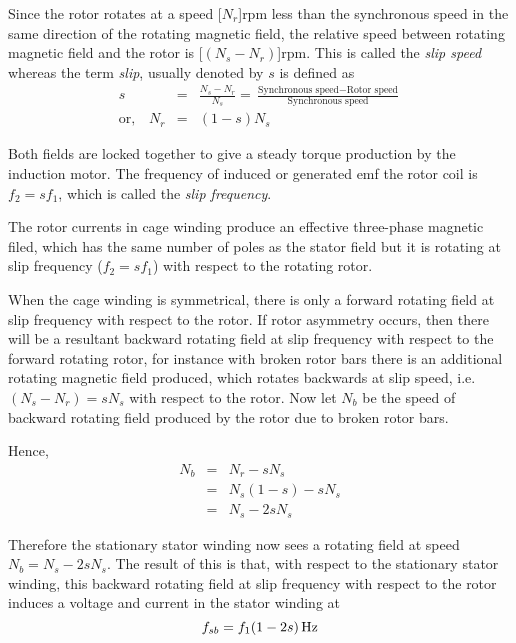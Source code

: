 \documentclass[a4paper,11pt]{report}
\begin{document}
Since the rotor rotates at a speed \unit[$N_{r}$]{rpm} less than the synchronous speed in the same direction of the rotating magnetic field, the relative speed between rotating magnetic field and the rotor is \unit[$(N_{s} - N_{r})$]{rpm}. This is called the \emph{slip speed} whereas the term \emph{slip}, usually denoted by $s$ is defined as
\begin{eqnarray*}
s &=& \frac{N_{s}-N_{r}}{N_{s}}=\frac{\textrm{Synchronous speed}-\textrm{Rotor speed}}{\textrm{Synchronous speed}} \\
\textrm{or,} \quad N_{r} &=& (1-s)N_{s}
\end{eqnarray*}

Both fields are locked together to give a steady torque production by the induction motor. The frequency of induced or generated emf the rotor coil is $f_{2}=sf_{1}$, which is called the \emph{slip frequency}.

The rotor currents in cage winding produce an effective three-phase magnetic filed, which has the same number of poles as the stator field but it is rotating at slip frequency ($f_{2}=sf_{1}$) with respect to the rotating rotor. 

When the cage winding is symmetrical, there is only a forward rotating field at slip frequency with respect to the rotor. If rotor asymmetry occurs, then there will be a resultant backward rotating field at slip frequency with respect to the forward rotating rotor, for instance with broken rotor bars there is an additional rotating magnetic field produced, which rotates backwards at slip speed, i.e. $(N_{s} - N_{r}) = sN_{s}$ with respect to the rotor.
Now let $N_{b}$ be the speed of backward rotating field produced by the rotor due to broken rotor bars.

Hence,
\begin{eqnarray}
N_{b} & = &N_{r} - sN_{s}  \nonumber \\
 &=& N_{s}(1-s) - sN_{s}  \nonumber \\
 &=& N_{s} - 2sN_{s}  
\end{eqnarray}

Therefore the stationary stator winding now sees a rotating field at speed $N_{b} = N_{s} - 2sN_{s}$. The result of this is that, with respect to the stationary stator winding, this backward rotating field at slip frequency with respect to the rotor induces a voltage and current in the stator winding at
\begin{equation}
f_{sb}=\unit[f_{1}(1-2s)]{Hz}
\end{equation}
\end{document}
